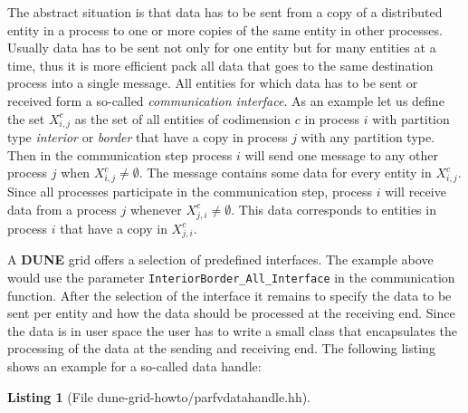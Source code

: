 \documentclass[11pt,a4paper,headinclude,footinclude,DIV16,headings=normal]{scrreprt}
\newcommand{\Dune}{{\sffamily\bfseries DUNE}\xspace}
\newtheorem{lst}{Listing}
\begin{document}
The abstract situation is that data has to be sent from a copy of a
distributed entity in a process to one or more copies of the same
entity in other processes. Usually data has to be sent not only for
one entity but for many entities at a time, thus it is more efficient
pack all data that goes to the same destination process into a single
message. All entities for which data has to be sent or received form a
so-called \textit{communication interface}. As an example let us define the set
$X_{i,j}^c$ as the set of all entities of codimension $c$ in process $i$
  with partition type \textit{interior} or \textit{border} that have
a copy in process $j$ with any partition type. Then in the
communication step process $i$ will send one message to any other
process $j$ when $X_{i,j}^c\neq\emptyset$. The message contains some data for
every entity in  $X_{i,j}^c$. Since all processes participate in the
communication step, process $i$ will receive data from a process $j$
whenever $X_{j,i}^c\neq\emptyset$. This data corresponds to entities
in process $i$ that have a copy in $X_{j,i}^c$.

A \Dune{} grid offers a selection of predefined interfaces. The example
above would use the parameter \lstinline!InteriorBorder_All_Interface!
in the communication function. After the
selection of the interface it remains to specify the data to be sent
per entity and how the data should be processed at the receiving
end. Since the data is in user space the user has to write a small
class that encapsulates the processing of the data at the sending and
receiving end. The following listing shows an example for a so-called
data handle:


\begin{lst}[File dune-grid-howto/parfvdatahandle.hh] \mbox{}
\nopagebreak

\end{lst}
\end{document}
